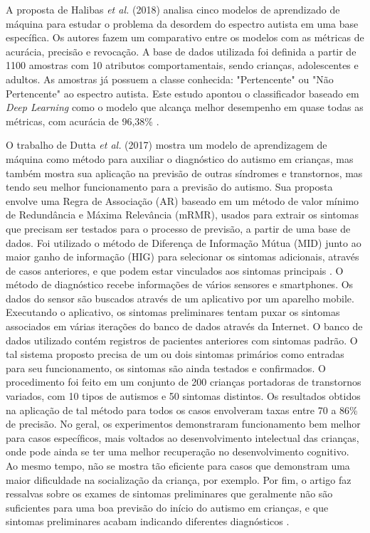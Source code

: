 \documentclass{template/sig-alternate-05-2015}
\begin{document}
A proposta de Halibas \textit{et al.} (2018) analisa cinco modelos de
aprendizado de máquina para estudar o problema da desordem do espectro
autista em uma base específica. Os autores fazem um comparativo entre
os modelos com as métricas de acurácia, precisão e revocação. A base
de dados utilizada foi definida a partir de 1100 amostras com 10
atributos comportamentais, sendo crianças, adolescentes e adultos. As
amostras já possuem a classe conhecida: "Pertencente" ou "Não
Pertencente" ao espectro autista. Este estudo apontou o classificador
baseado em \textit{Deep Learning} como o modelo que alcança melhor
desempenho em quase todas as métricas, com acurácia de 96,38\%
\cite{Halibas:2018}.

O trabalho de Dutta \textit{et al.} (2017) mostra um modelo de
aprendizagem de máquina como método para auxiliar o diagnóstico do
autismo em crianças, mas também mostra sua aplicação na previsão de
outras síndromes e transtornos, mas tendo seu melhor funcionamento
para a previsão do autismo. Sua proposta envolve uma Regra de
Associação (AR) baseado em um método de valor mínimo de Redundância e
Máxima Relevância (mRMR), usados para extrair os sintomas que precisam
ser testados para o processo de previsão, a partir de uma base de
dados. Foi utilizado o método de Diferença de Informação Mútua (MID)
junto ao maior ganho de informação (HIG) para selecionar os sintomas
adicionais, através de casos anteriores, e que podem estar vinculados
aos sintomas principais \cite{Dutta:2017}. O método de diagnóstico
recebe informações de vários sensores e smartphones. Os dados do
sensor são buscados através de um aplicativo por um aparelho
mobile. Executando o aplicativo, os sintomas preliminares tentam puxar
os sintomas associados em várias iterações do banco de dados através
da Internet.  O banco de dados utilizado contém registros de pacientes
anteriores com sintomas padrão. O tal sistema proposto precisa de um
ou dois sintomas primários como entradas para seu funcionamento, os
sintomas são ainda testados e confirmados. O procedimento foi feito em
um conjunto de 200 crianças portadoras de transtornos variados, com 10
tipos de autismos e 50 sintomas distintos. Os resultados obtidos na
aplicação de tal método para todos os casos envolveram taxas entre 70
a 86\% de precisão. No geral, os experimentos demonstraram
funcionamento bem melhor para casos específicos, mais voltados ao
desenvolvimento intelectual das crianças, onde pode ainda se ter uma
melhor recuperação no desenvolvimento cognitivo. Ao mesmo tempo, não
se mostra tão eficiente para casos que demonstram uma maior
dificuldade na socialização da criança, por exemplo. Por fim, o artigo
faz ressalvas sobre os exames de sintomas preliminares que geralmente
não são suficientes para uma boa previsão do início do autismo em
crianças, e que sintomas preliminares acabam indicando diferentes
diagnósticos \cite{Dutta:2017}.
\end{document}
